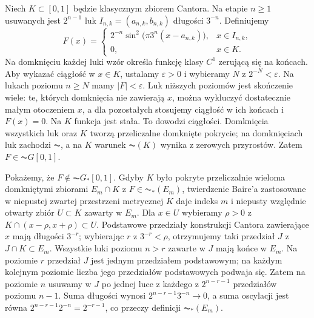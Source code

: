 \begin{przyklad}\label{ma1:kh:ex:denjoy-strict}\label{it:ex:broad-denjoy-strict}
Niech $K\subset[0,1]$ będzie klasycznym zbiorem Cantora. Na etapie $n\ge1$ usuwanych jest $2^{n-1}$ luk $I_{n,k}=(a_{n,k},b_{n,k})$ długości $3^{-n}$. Definiujemy
\[
F(x)=\begin{cases}
2^{-n}\sin^2\!\bigl(\pi3^n(x-a_{n,k})\bigr),&x\in I_{n,k},\\
0,&x\in K.
\end{cases}
\]
Na domknięciu każdej luki wzór określa funkcję klasy $C^1$ zerującą się na końcach. Aby wykazać ciągłość w $x\in K$, ustalamy $\varepsilon>0$ i wybieramy $N$ z $2^{-N}<\varepsilon$. Na lukach poziomu $n\ge N$ mamy $|F|<\varepsilon$. Luk niższych poziomów jest skończenie wiele: te, których domknięcia nie zawierają $x$, można wykluczyć dostatecznie małym otoczeniem $x$, a dla pozostałych stosujemy ciągłość w ich końcach i $F(x)=0$. Na $K$ funkcja jest stała. To dowodzi ciągłości. Domknięcia wszystkich luk oraz $K$ tworzą przeliczalne domknięte pokrycie; na domknięciach luk zachodzi $\AC$, a na $K$ warunek $\AC(K)$ wynika z zerowych przyrostów. Zatem $F\in\AC G[0,1]$.

Pokażemy, że $F\notin\AC G_*[0,1]$. Gdyby $K$ było pokryte przeliczalnie wieloma domkniętymi zbiorami $E_m\cap K$ z $F\in\AC_*(E_m)$, twierdzenie Baire'a zastosowane w niepustej zwartej przestrzeni metrycznej $K$ daje indeks $m$ i niepusty względnie otwarty zbiór $U\subset K$ zawarty w $E_m$. Dla $x\in U$ wybieramy $\rho>0$ z $K\cap(x-\rho,x+\rho)\subset U$. Podstawowe przedziały konstrukcji Cantora zawierające $x$ mają długości $3^{-r}$; wybierając $r$ z $3^{-r}<\rho$, otrzymujemy taki przedział $J$ z $J\cap K\subset E_m$. Wszystkie luki poziomu $n>r$ zawarte w $J$ mają końce w $E_m$. Na poziomie $r$ przedział $J$ jest jednym przedziałem podstawowym; na każdym kolejnym poziomie liczba jego przedziałów podstawowych podwaja się. Zatem na poziomie $n$ usuwamy w $J$ po jednej luce z każdego z $2^{n-r-1}$ przedziałów poziomu $n-1$. Suma długości wynosi $2^{n-r-1}3^{-n}\to0$, a suma oscylacji jest równa $2^{n-r-1}2^{-n}=2^{-r-1}$, co przeczy definicji $\AC_*(E_m)$.


\end{przyklad}
